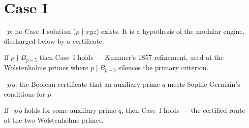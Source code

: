 \section{Case I}\label{sec:casei}

\begin{definition}\label{def:caseIholds}
  \leanok
  ~$p$: no Case~I solution ($p \nmid xyz$) exists. It is a
  hypothesis of the modular engine, discharged below by a certificate.
\end{definition}

\begin{theorem}\label{thm:caseIb5}
  \leanok
  If $p \nmid B_{p-5}$ then Case~I holds --- Kummer's 1857 refinement, used at the
  Wolstenholme primes where $p \mid B_{p-3}$ silences the primary criterion.
\end{theorem}

\begin{definition}\label{def:sgcert}
  \leanok
  ~$p\,q$: the Boolean certificate that an auxiliary prime $q$ meets
  Sophie Germain's conditions for $p$.
\end{definition}

\begin{theorem}\label{thm:caseIsg}
  \leanok
  If ~$p\,q$ holds for some auxiliary prime $q$, then Case~I holds ---
  the certified route at the two Wolstenholme primes.
\end{theorem}
